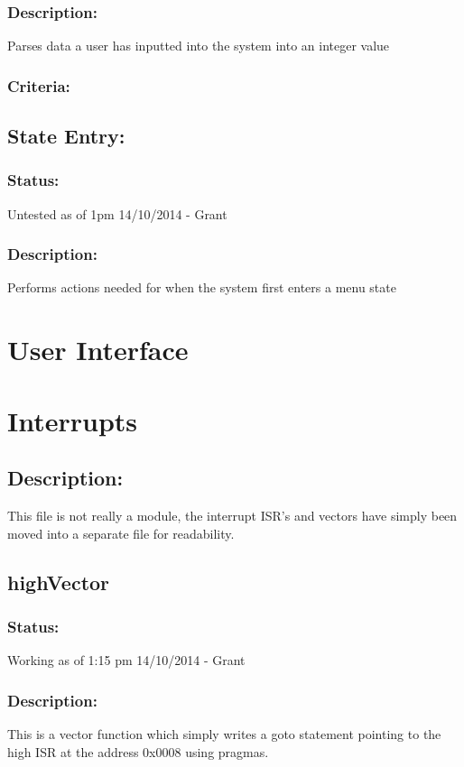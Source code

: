 \documentclass[]{report}
\begin{document}
\subsubsection{Description:}
Parses data a user has inputted into the system into an integer value

\subsubsection{Criteria:}

\subsection{State Entry:}
\subsubsection{Status:}
Untested as of 1pm 14/10/2014 - Grant

\subsubsection{Description:}
Performs actions needed for when the system first enters a menu state


\newpage
\section{User Interface}


\newpage
\section{Interrupts}
\subsection{Description:}
This file is not really a module, the interrupt ISR's and vectors have simply been moved into a separate file for readability.

\subsection{highVector}
\subsubsection{Status:}
Working as of 1:15 pm 14/10/2014 - Grant

\subsubsection{Description:}
This is a vector function which simply writes a goto statement pointing to the high ISR at the address 0x0008 using pragmas.
\end{document}
